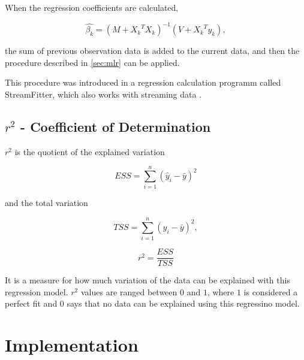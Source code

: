 When the regression coefficients are calculated,

\begin{equation}
    \hat{\beta_k} = (M + {X_k}^T X_k)^{-1}(V + {X_k}^T y_k),
\end{equation}

the sum of previous observation data is added to the current data, and then the procedure described in \vref{sec:mlr} can be applied.

This procedure was introduced in a regression calculation programm called StreamFitter, which also works with streaming data \autocite{StreamFitter}.

\subsection{$ r^2 $ - Coefficient of Determination}

$ r^2 $ is the quotient of the explained variation

\begin{equation}
    ESS = \sum_{i=1}^{n} (\hat{y}_i - \bar{y})^2
\end{equation}

and the total variation

\begin{equation}
    TSS = \sum_{i=1}^{n} (y_i - \bar{y})^2,
\end{equation}

\begin{equation}
    r^2 = \frac{ESS}{TSS}
\end{equation}

It is a measure for how much variation of the data can be explained with this regression model. $ r^2 $ values are ranged between $ 0 $ and $ 1 $, where $ 1 $ is considered a perfect fit and $ 0 $ says that no data can be explained using this regressino model.

\section{Implementation}

